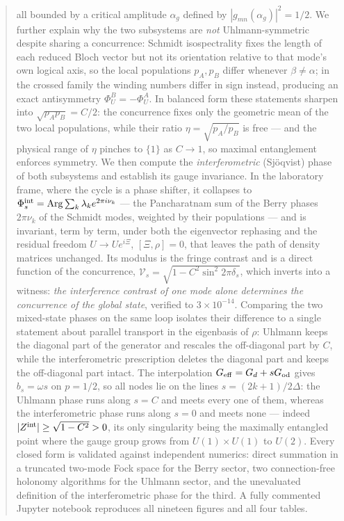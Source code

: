 \documentclass[11pt]{article}
\newcommand{\Arg}{\operatorname{Arg}}
\begin{document}
\begin{abstract}
all bounded by a critical amplitude $\alpha_g$ defined by
$|g_{mn}(\alpha_g)|^2=1/2$. We further explain why the two subsystems are
\emph{not} Uhlmann-symmetric despite sharing a concurrence: Schmidt
isospectrality fixes the length of each reduced Bloch vector but not its
orientation relative to that mode's own logical axis, so the local populations
$p_A,p_B$ differ whenever $\beta\neq\alpha$; in the crossed family the winding
numbers differ in sign instead, producing an exact antisymmetry
$\Phi_U^B=-\Phi_U^A$. In balanced form these statements sharpen into
$\sqrt{p_Ap_B}=C/2$: the concurrence fixes only the geometric mean of the two
local populations, while their ratio $\eta=\sqrt{p_A/p_B}$ is free --- and the
physical range of $\eta$ pinches to $\{1\}$ as $C\to1$, so maximal entanglement
enforces symmetry. We then compute the \emph{interferometric} (Sj\"oqvist) phase of both
subsystems and establish its gauge invariance. In the laboratory frame, where
the cycle is a phase shifter, it collapses to
$\Phi^{\rm int}_s=\Arg\sum_k\lambda_ke^{2\pi i\nu_k}$ --- the Pancharatnam sum
of the Berry phases $2\pi\nu_k$ of the Schmidt modes, weighted by their
populations --- and is invariant, term by term, under both the eigenvector
rephasing and the residual freedom $U\to Ue^{i\Xi}$, $[\Xi,\rho]=0$, that leaves
the path of density matrices unchanged. Its modulus is the fringe contrast and
is a direct function of the concurrence,
$\mathcal V_s=\sqrt{1-C^2\sin^2 2\pi\delta_s}$, which inverts into a witness:
\emph{the interference contrast of one mode alone determines the concurrence of
the global state}, verified to $3\times10^{-14}$. Comparing the two mixed-state
phases on the same loop isolates their difference to a single statement about
parallel transport in the eigenbasis of $\rho$: Uhlmann keeps the diagonal part
of the generator and rescales the off-diagonal part by $C$, while the
interferometric prescription deletes the diagonal part and keeps the
off-diagonal part intact. The interpolation $G_{\rm eff}=G_d+sG_{\rm od}$ gives
$b_s=\omega s$ on $p=1/2$, so all nodes lie on the lines $s=(2k+1)/2\Delta$:
the Uhlmann phase runs along $s=C$ and meets every one of them, whereas the
interferometric phase runs along $s=0$ and meets none --- indeed
$|Z^{\rm int}|\geq\sqrt{1-C^2}>0$, its only singularity being the maximally
entangled point where the gauge group grows from $U(1)\times U(1)$ to $U(2)$.
Every closed form is validated against independent
numerics: direct summation in a truncated two-mode Fock space for the Berry
sector, two connection-free holonomy algorithms for the Uhlmann sector, and the
unevaluated definition of the interferometric phase for the third.
A fully commented Jupyter notebook reproduces all nineteen figures and all four
tables.
\end{abstract}
\end{document}
